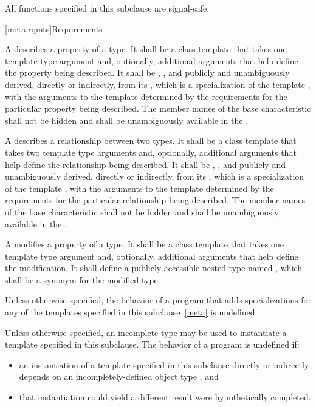 \pnum
{}%
All functions specified in this subclause are signal-safe.

[meta.rqmts]{Requirements}

\pnum
A  describes a property
of a type. It shall be a class template that takes one template type
argument and, optionally, additional arguments that help define the
property being described. It shall be ,
,
and publicly and unambiguously derived, directly or indirectly, from
its , which is
a specialization of the template
, with
the arguments to the template  determined by the
requirements for the particular property being described.
The member names of the base characteristic shall not be hidden and shall be
unambiguously available in the .

\pnum
A  describes a
relationship between two types. It shall be a class template that
takes two template type arguments and, optionally, additional
arguments that help define the relationship being described. It shall
be , ,
and publicly and unambiguously derived, directly or
indirectly, from
its , which is a specialization
of the template
, with
the arguments to the template  determined by the
requirements for the particular relationship being described.
The member names of the base characteristic shall not be hidden and shall be
unambiguously available in the .

\pnum
A 
modifies a property
of a type. It shall be a class template that takes one
template type argument and, optionally, additional arguments that help
define the modification. It shall define a publicly accessible nested type
named , which shall be a synonym for the modified type.

\pnum
Unless otherwise specified,
the behavior of a program that adds specializations
for any of the templates specified in this subclause~\ref{meta}
is undefined.

\pnum
Unless otherwise specified, an incomplete type may be used
to instantiate a template specified in this subclause.
The behavior of a program is undefined if:
\begin{itemize}
\item
  an instantiation of a template specified in this subclause
  directly or indirectly depends on
  an incompletely-defined object type , and
\item
  that instantiation could yield a different result
  were  hypothetically completed.
\end{itemize}

